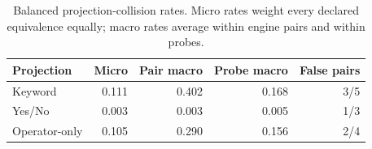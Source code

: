 \begin{table}[H]
\centering
\caption{Balanced projection-collision rates. Micro rates weight every declared equivalence equally; macro rates average within engine pairs and within probes.}
\label{tab:balanced-collision}
\small
\begin{tabular}{lrrrr}
\toprule
Projection & Micro & Pair macro & Probe macro & False pairs \\
\midrule
Keyword & 0.111 & 0.402 & 0.168 & 3/5 \\
Yes/No & 0.003 & 0.003 & 0.005 & 1/3 \\
Operator-only & 0.105 & 0.290 & 0.156 & 2/4 \\
\bottomrule
\end{tabular}
\end{table}

